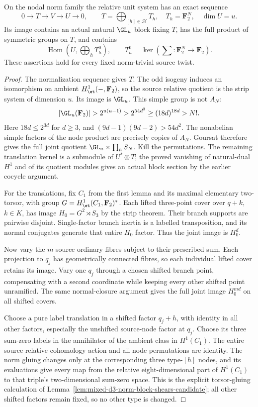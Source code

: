 \begin{lemma}
\label{lem:mixed-odd-normalization-block-hearts-candidate}
On the nodal norm family the relative unit system has an exact
sequence
\[
 0\longrightarrow T\longrightarrow V\longrightarrow U
 \longrightarrow0,
 \qquad T=\bigoplus_{[h]\in\mathcal H}T_h,\quad
 T_h=\mathbf F_2^N,\quad\dim U=u.
\]
Its image contains an actual natural $\GL_u$ block fixing $T$,
has the full product of symmetric groups on $T$, and contains
\[
             \operatorname{Hom}\left(U,\bigoplus_hT_h^0\right),
 \qquad T_h^0=\ker\left(\sum:\mathbf F_2^N\to\mathbf F_2\right).
\]
These assertions hold for every fixed norm-trivial source twist.
\end{lemma}
\begin{proof}
The normalization sequence gives $T$. The odd isogeny induces
an isomorphism on ambient $H^1_{\et}(-,\mathbf F_2)$, so the
source relative quotient is the strip system of dimension $u$.
Its image is $\GL_u$. This simple group is not $A_N$:
\[
 |\GL_u(\mathbf F_2)|>2^{u(u-1)}>2^{54d^2}
       \geq(18d)^{18d}>N!.
\]
Here $18d\leq2^{3d}$ for $d\geq3$, and
$(9d-1)(9d-2)>54d^2$. The nonabelian simple factors of the
node product are precisely copies of $A_N$. Goursat therefore
gives the full joint quotient
$\GL_u\times\prod_hS_N$. Kill the permutations. The remaining
translation kernel is a submodule of $U^*\otimes T$; the proved
vanishing of natural-dual $H^1$ and of its quotient modules
gives an actual block section by the earlier cocycle argument.

For the translations, fix $C_1$ from the first lemma and its
maximal elementary two-torsor, with group
$G=H^1_{\et}(C_1,\mathbf F_2)^*$. Each lifted three-point cover
over $q+k$, $k\in K$, has image $H_0=G^2\rtimes S_3$ by the
strip theorem. Their branch supports are pairwise disjoint.
Single-factor branch inertia is a labelled transposition, and
its normal conjugates generate that entire $H_0$ factor.
Thus the joint image is $H_0^d$.

Now vary the $m$ source ordinary fibres subject to their prescribed
sum. Each projection to $q_j$ has geometrically connected fibres,
so each individual lifted cover retains its image. Vary one
$q_j$ through a chosen shifted branch point, compensating with
a second coordinate while keeping every other shifted point
unramified. The same normal-closure argument gives the full
joint image $H_0^{md}$ on all shifted covers.

Choose a pure label translation in a shifted factor $q_j+h$,
with identity in all other factors, especially the unshifted
source-node factor at $q_j$. Choose its three sum-zero labels
in the annihilator of the ambient class in $H^1(C_1)$.
The entire source relative cohomology action and all node
permutations are identity. The norm gluing changes only at
the corresponding three type-$[h]$ nodes, and its evaluations
give every map from the relative eight-dimensional part of
$H^1(C_1)$ to that triple's two-dimensional sum-zero space.
This is the explicit torsor-gluing calculation of
Lemma~\ref{lem:mixed-d3-norm-block-shears-candidate}; all other
shifted factors remain fixed, so no other type is changed.


\end{proof}
